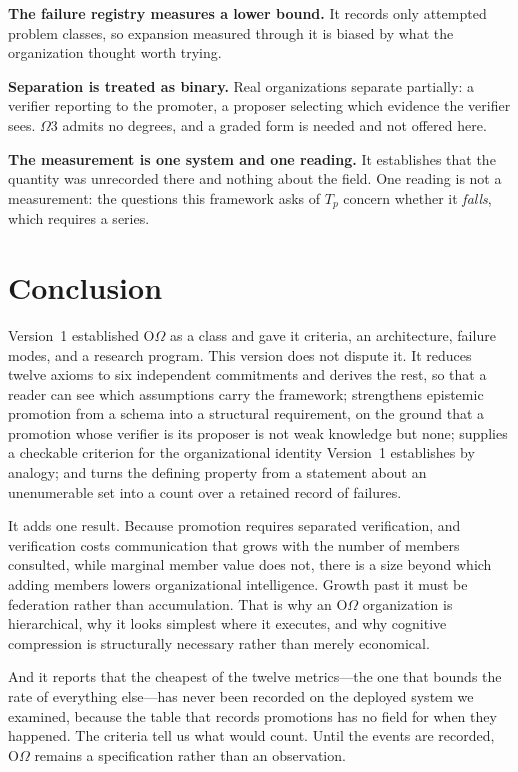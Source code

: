 \documentclass[11pt]{article}
\newcommand{\OOm}{\ensuremath{\mathrm{O}\Omega}}
\newcommand{\Tp}{\ensuremath{T_p}}
\begin{document}
\textbf{The failure registry measures a lower bound.} It records only attempted problem classes, so expansion measured through it is biased by what the organization thought worth trying.

\textbf{Separation is treated as binary.} Real organizations separate partially: a verifier reporting to the promoter, a proposer selecting which evidence the verifier sees. $\Omega$3 admits no degrees, and a graded form is needed and not offered here.

\textbf{The measurement is one system and one reading.} It establishes that the quantity was unrecorded there and nothing about the field. One reading is not a measurement: the questions this framework asks of $\Tp$ concern whether it \emph{falls}, which requires a series.

\section{Conclusion}

Version~1 established \OOm{} as a class and gave it criteria, an architecture, failure modes, and a research program. This version does not dispute it. It reduces twelve axioms to six independent commitments and derives the rest, so that a reader can see which assumptions carry the framework; strengthens epistemic promotion from a schema into a structural requirement, on the ground that a promotion whose verifier is its proposer is not weak knowledge but none; supplies a checkable criterion for the organizational identity Version~1 establishes by analogy; and turns the defining property from a statement about an unenumerable set into a count over a retained record of failures.

It adds one result. Because promotion requires separated verification, and verification costs communication that grows with the number of members consulted, while marginal member value does not, there is a size beyond which adding members lowers organizational intelligence. Growth past it must be federation rather than accumulation. That is why an \OOm{} organization is hierarchical, why it looks simplest where it executes, and why cognitive compression is structurally necessary rather than merely economical.

And it reports that the cheapest of the twelve metrics---the one that bounds the rate of everything else---has never been recorded on the deployed system we examined, because the table that records promotions has no field for when they happened. The criteria tell us what would count. Until the events are recorded, \OOm{} remains a specification rather than an observation.



\end{document}
